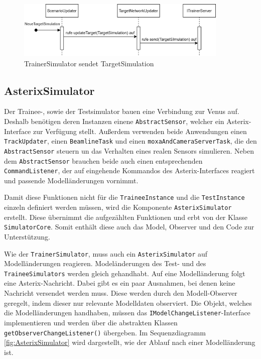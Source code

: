 \begin{figure}[ht]
    \centering
    \includegraphics[width=0.9\textwidth]{content/assets/Kapitel4/TargetSimulationNetwork.png}
    \caption{TrainerSimulator sendet TargetSimulation}
    \label{fig:TrainerTargetSimulation}
\end{figure}

\subsection{AsterixSimulator}
Der Trainee-, sowie der Testsimulator bauen eine Verbindung zur Venus auf. Deshalb benötigen deren Instanzen einene \texttt{AbstractSensor}, welcher ein Asterix-Interface zur Verfügung stellt. Außerdem verwenden beide Anwendungen einen \texttt{TrackUpdater}, einen \texttt{BeamlineTask} und einen \texttt{moxaAndCameraServerTask}, die den \texttt{AbstractSensor} steuern un das Verhalten eines realen Sensors simulieren. Neben dem \texttt{AbstractSensor} brauchen beide auch einen entsprechenden \texttt{CommandListener}, der auf eingehende Kommandos des Asterix-Interfaces reagiert und passende Modelländerungen vornimmt.

Damit diese Funktionen nicht für die \texttt{TraineeInstance} und die \texttt{TestInstance} einzeln definiert werden müssen, wird die Komponente \texttt{AsterixSimulator} erstellt. Diese übernimmt die aufgezählten Funktionen und erbt von der Klasse \texttt{SimulatorCore}. Somit enthält diese auch das Model, Observer und den Code zur Unterstützung.

Wie der \texttt{TrainerSimulator}, muss auch ein \texttt{AsterixSimulator} auf Modelländerungen reagieren. Modeländerungen des Test- und des \texttt{TraineeSimulators} werden gleich gehandhabt. Auf eine Modelländerung folgt eine Asterix-Nachricht. Dabei gibt es ein paar Ausnahmen, bei denen keine Nachricht versendet werden muss. Diese werden durch den Modell-Observer geregelt, indem dieser nur relevante Modelldaten observiert. Die Objekt, welches die Modelländerungen handhaben, müssen das \texttt{IModelChangeListener}-Interface implementieren und werden über die abstrakten Klassen \texttt{getObserverChangeListener()} übergeben. Im Sequenzdiagramm \ref{fig:AsterixSimulator} wird dargestellt, wie der Ablauf nach einer Modelländerung ist. 

